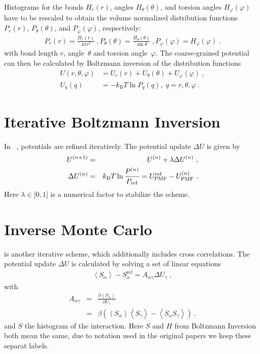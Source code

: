 Histograms for the bonds $H_r(r)$, angles $H_\theta(\theta)$, and torsion angles $H_\varphi(\varphi)$ have to be rescaled to obtain the volume normalized distribution functions $P_r(r)$, $P_\theta(\theta)$, and $P_\varphi(\varphi)$, respectively: 
%
\begin{align}
    P_r(r) = \frac{H_r(r)}{4\pi r^2}~,
    P_\theta(\theta) = \frac{H_\theta(\theta)}{\sin \theta}~,
    P_\varphi(\varphi) = H_\varphi (\varphi)~.
    \label{eq:boltzmann_norm}
\end{align}
with bond length $r$, angle~$\theta$ and torsion angle~$\varphi$.%
The coarse-grained potential can then be calculated by Boltzmann inversion of the distribution functions
%
\begin{align}
    \label{eq:boltzmann_pmf}
    U({r}, \theta, \varphi) &= U_r({r}) + U_{\theta}(\theta) + U_{\varphi}(\varphi)~, \\
    U_q({q}) &= - k_\text{B} T \ln P_q( q ),\; q=r, \theta, \varphi~.
    \nonumber
\end{align}


\section{Iterative Boltzmann Inversion}
\label{sec:ibi}

In \ibi~\cite{Reith:2003}, potentials are refined iteratively. The potential update $\Delta U$ is given by
\begin{eqnarray}
  \label{eq:iter_boltzmann}
  U^{(n+1)} &=& U^{(n)} + \lambda \Delta U^{(n)}~, \\
  \Delta U^{(n)} &=&  k_\text{B} T \ln  \frac{P^{(n)}}{P_{\rm ref}}
  =  U_\text{PMF}^\text{ref} - U_\text{PMF}^{(n)}~.
\end{eqnarray}
Here $\lambda \in ]0,1]$ is a numerical factor to stabilize the scheme.

\section{Inverse Monte Carlo}
\label{sec:imc}

\imc is another iterative scheme, which additionally includes cross correlations. The potential update $\Delta U$ is calculated by solving a set of linear equations
\begin{align}
    \left<S_{\alpha}\right> - S_{\alpha}^{\text{ref}}= A_{\alpha \gamma} \Delta U_{\gamma}~,
  \label{eq:imc}
\end{align}
%
with
\begin{eqnarray}
  \label{eq:covariance}
  A_{\alpha \gamma} &=& \frac{\partial \left< S_{\alpha} \right> }{\partial U_{\gamma}}  \\
  \nonumber
  &=&
  \beta \left( \left<S_{\alpha} \right>\left<S_{\gamma} \right> - \left<S_{\alpha} S_{\gamma} \right>  \right)~.
  \nonumber
\end{eqnarray}
and $S$ the histogram of the interaction. Here $S$ and $H$ from Boltzmann Inversion both mean the same, due to notation used in the original papers we keep these separat labels.


